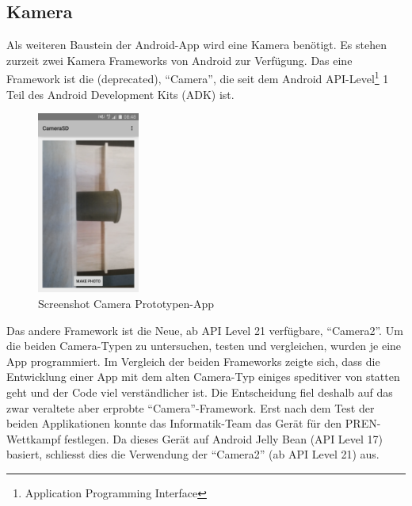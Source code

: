 \subsection{Kamera}
Als weiteren Baustein der Android-App wird eine Kamera benötigt. Es stehen zurzeit 
zwei Kamera Frameworks von Android zur Verfügung. Das eine Framework ist die (deprecated)‚ 
\enquote{Camera}, die seit dem Android API-Level\footnote{Application Programming Interface} 1 Teil des 
Android Development Kits (ADK) ist.
%
\begin{figure}[h!]
	\includegraphics[width=0.3\textwidth,clip,trim=0mm 0mm 0mm 0mm]
	{Enddokumentation/Bilder/Screenshot_CameraSD.png}
	\centering
	\caption{Screenshot Camera Prototypen-App}
	\label{abb:ScreenshotCameraSD}
\end{figure}
%
Das andere Framework ist die Neue, ab API Level 21 verfügbare‚ 
\enquote{Camera2}. Um die beiden Camera-Typen zu untersuchen, testen und vergleichen, wurden je eine App programmiert.
Im Vergleich der beiden Frameworks zeigte sich, dass die Entwicklung einer App mit dem alten Camera-Typ 
einiges speditiver von statten geht und der Code viel verständlicher ist. Die Entscheidung fiel deshalb 
auf das zwar veraltete aber erprobte  \enquote{Camera}-Framework.
\newline
\newline
Erst nach dem Test der beiden Applikationen konnte das Informatik-Team das Gerät für den PREN-Wettkampf festlegen. 
Da dieses Gerät auf Android Jelly Bean (API Level 17) basiert, schliesst dies die Verwendung 
der  \enquote{Camera2} (ab API Level 21) aus.
